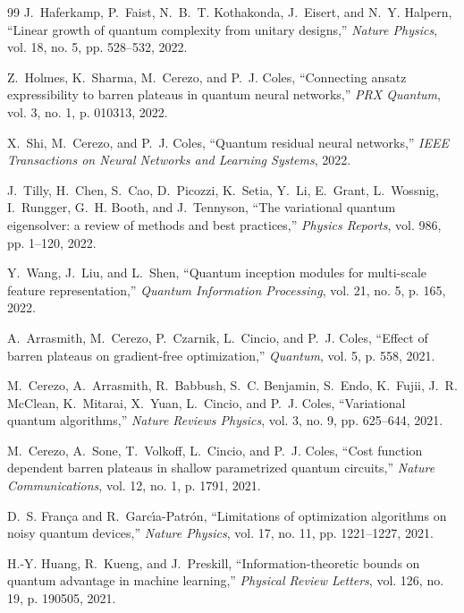 \documentclass[journal]{IEEEtran}
\begin{document}
\begin{thebibliography}{99}
J.~Haferkamp, P.~Faist, N.~B.~T. Kothakonda, J.~Eisert, and N.~Y. Halpern,
``Linear growth of quantum complexity from unitary designs,'' \emph{Nature Physics}, vol. 18, no. 5, pp. 528--532, 2022.

Z.~Holmes, K.~Sharma, M.~Cerezo, and P.~J. Coles,
``Connecting ansatz expressibility to barren plateaus in quantum neural networks,'' \emph{PRX Quantum}, vol. 3, no. 1, p. 010313, 2022.

X.~Shi, M.~Cerezo, and P.~J. Coles,
``Quantum residual neural networks,'' \emph{IEEE Transactions on Neural Networks and Learning Systems}, 2022.

J.~Tilly, H.~Chen, S.~Cao, D.~Picozzi, K.~Setia, Y.~Li, E.~Grant, L.~Wossnig, I.~Rungger, G.~H. Booth, and J.~Tennyson,
``The variational quantum eigensolver: a review of methods and best practices,'' \emph{Physics Reports}, vol. 986, pp. 1--120, 2022.

Y.~Wang, J.~Liu, and L.~Shen,
``Quantum inception modules for multi-scale feature representation,'' \emph{Quantum Information Processing}, vol. 21, no. 5, p. 165, 2022.

A.~Arrasmith, M.~Cerezo, P.~Czarnik, L.~Cincio, and P.~J. Coles,
``Effect of barren plateaus on gradient-free optimization,'' \emph{Quantum}, vol. 5, p. 558, 2021.

M.~Cerezo, A.~Arrasmith, R.~Babbush, S.~C. Benjamin, S.~Endo, K.~Fujii, J.~R. McClean, K.~Mitarai, X.~Yuan, L.~Cincio, and P.~J. Coles,
``Variational quantum algorithms,'' \emph{Nature Reviews Physics}, vol. 3, no. 9, pp. 625--644, 2021.

M.~Cerezo, A.~Sone, T.~Volkoff, L.~Cincio, and P.~J. Coles,
``Cost function dependent barren plateaus in shallow parametrized quantum circuits,'' \emph{Nature Communications}, vol. 12, no. 1, p. 1791, 2021.

D.~S. Fran{\c{c}}a and R.~Garc{\'\i}a-Patr{\'o}n,
``Limitations of optimization algorithms on noisy quantum devices,'' \emph{Nature Physics}, vol. 17, no. 11, pp. 1221--1227, 2021.

H.-Y. Huang, R.~Kueng, and J.~Preskill,
``Information-theoretic bounds on quantum advantage in machine learning,'' \emph{Physical Review Letters}, vol. 126, no. 19, p. 190505, 2021.


\end{thebibliography}
\end{document}
